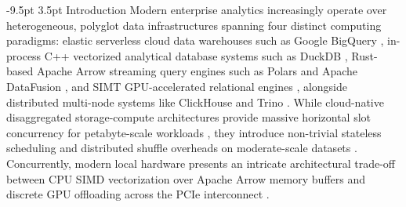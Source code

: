 \documentclass[10pt,a4paper]{article}
\makeatletter
\renewcommand\section{\@startsection{section}{1}{\z@}%
  {-9.5pt \@plus -2pt \@minus -1.5pt}%
  {3.5pt \@plus 1pt}%
  {\normalfont\large\bfseries}}
\makeatother
\begin{document}


\section{Introduction}
Modern enterprise analytics increasingly operate over heterogeneous, polyglot data infrastructures spanning four distinct computing paradigms: elastic serverless cloud data warehouses such as Google BigQuery \cite{melnik2010dremel, melnik2020dremel, lounissi2025funda}, in-process C++ vectorized analytical database systems such as DuckDB \cite{raasveldt2019duckdb, kuiper2024duckdb_ooc}, Rust-based Apache Arrow streaming query engines such as Polars and Apache DataFusion \cite{lamb2024datafusion}, and SIMT GPU-accelerated relational engines \cite{chrysogelos2019hetexchange, shanbhag2020crystal, bress2013hype}, alongside distributed multi-node systems like ClickHouse \cite{schulze2024clickhouse} and Trino \cite{sethi2019presto}. While cloud-native disaggregated storage-compute architectures provide massive horizontal slot concurrency for petabyte-scale workloads \cite{shojaee2024serverless, abdalla2022bigdata}, they introduce non-trivial stateless scheduling and distributed shuffle overheads on moderate-scale datasets \cite{begoli2018calcite, garcia2008database, lounissi2025funda}. Concurrently, modern local hardware presents an intricate architectural trade-off between CPU SIMD vectorization over Apache Arrow memory buffers and discrete GPU offloading across the PCIe interconnect \cite{milicevic2024dlquery, root2019mapd, kim2022blazingsql}.
\end{document}
